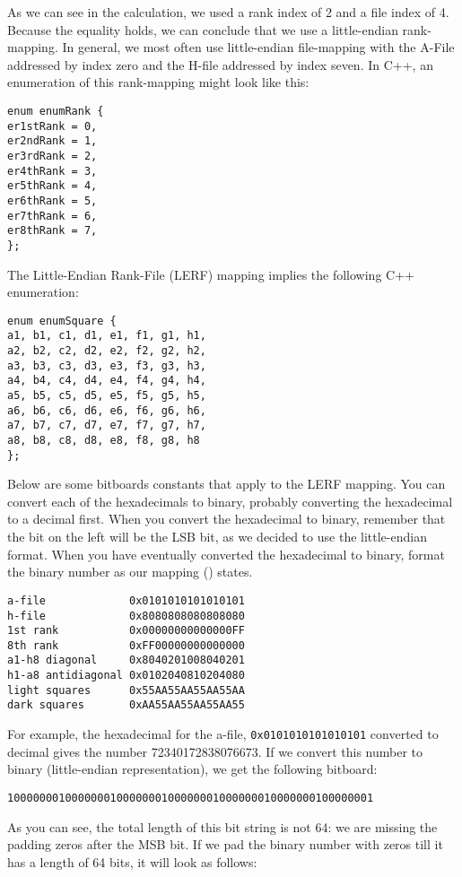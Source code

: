 %
As we can see in the calculation, we used a rank index of 2 and a file index of 4.
Because the equality holds, we can conclude that we use a little-endian rank-mapping.
In general, we most often use little-endian file-mapping with the A-File addressed by index zero and the H-file addressed by index seven.
In C++, an enumeration of this rank-mapping might look like this:
%
\begin{verbatim}
enum enumRank {
er1stRank = 0,
er2ndRank = 1,
er3rdRank = 2,
er4thRank = 3,
er5thRank = 4,
er6thRank = 5,
er7thRank = 6,
er8thRank = 7,
};
\end{verbatim}
%
The Little-Endian Rank-File (LERF) mapping implies the following C++ enumeration:
%
\begin{verbatim}
enum enumSquare {
a1, b1, c1, d1, e1, f1, g1, h1,
a2, b2, c2, d2, e2, f2, g2, h2,
a3, b3, c3, d3, e3, f3, g3, h3,
a4, b4, c4, d4, e4, f4, g4, h4,
a5, b5, c5, d5, e5, f5, g5, h5,
a6, b6, c6, d6, e6, f6, g6, h6,
a7, b7, c7, d7, e7, f7, g7, h7,
a8, b8, c8, d8, e8, f8, g8, h8
};
\end{verbatim}
%
Below are some bitboards constants that apply to the LERF mapping.
You can convert each of the hexadecimals to binary, probably converting the hexadecimal to a decimal first.
When you convert the hexadecimal to binary, remember that the bit on the left will be the LSB bit, as we decided to use the little-endian format.
When you have eventually converted the hexadecimal to binary, format the binary number as our mapping () states.
%
\begin{verbatim}
a-file             0x0101010101010101
h-file             0x8080808080808080
1st rank           0x00000000000000FF
8th rank           0xFF00000000000000
a1-h8 diagonal     0x8040201008040201
h1-a8 antidiagonal 0x0102040810204080
light squares      0x55AA55AA55AA55AA
dark squares       0xAA55AA55AA55AA55
\end{verbatim}
%
For example, the hexadecimal for the a-file, \texttt{0x0101010101010101} converted to decimal gives the number 72340172838076673. If we convert this number to binary (little-endian representation), we get the following bitboard:
%
\begin{center}
	\texttt{100000001000000010000000100000001000000010000000100000001}
\end{center}
%
As you can see, the total length of this bit string is not 64: we are missing the padding zeros after the MSB bit.
If we pad the binary number with zeros till it has a length of 64 bits, it will look as follows:
